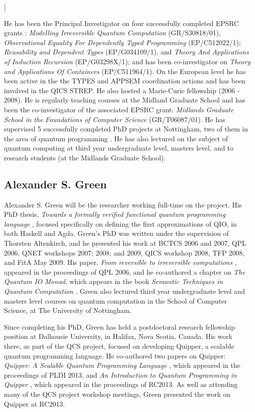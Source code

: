 \documentclass[a4paper]{article}
\begin{document}
\twocolumn[

He has been the Principal Investigator on four successfully completed
EPSRC grants : \emph{Modelling Irreversible Quantum Computation}
(GR/S30818/01), \emph{Observational Equality For Dependently Typed
  Programming} (EP/C512022/1); \emph{Reusability and Dependent Types} (EP/G034109/1), 
and 
\emph{Theory And Applications of Induction
  Recursion} (EP/G03298X/1); and has been co-investigator on
\emph{Theory and Applications Of Containers} (EP/C511964/1). 
On the European level he has been active in the the
TYPES and APPSEM coordination actions and has been involved in the
QICS STREP. He also hosted a Marie-Curie fellowship (2006 - 2008). He
is regularly teaching courses at the Midland Graduate School and has
been the co-investigator of the associated EPSRC grant: \emph{Midlands
  Graduate School in the Foundations of Computer Science}
(GR/T06087/01). He has supervised 5 successfully completed PhD
projects at Nottingham, two of them in the area of quantum
programming . He has also lectured 
on the subject of quantum computing at third year
undergraduate level, masters level, and to research students 
(at the Midlands Graduate School).

\subsection*{Alexander S. Green}
Alexander S. Green will be the researcher working full-time on the
project. His PhD thesis, \emph{Towards a formally verified functional
  quantum programming language} , focused
specifically on defining the first approximations of QIO, in both
Haskell and Agda. Green's PhD was written under the supervision of
Thorsten Altenkirch, and he presented his work at BCTCS 2006
and 2007, QPL 2006, QNET workshops 2007; 2008; and 2009, QICS workshop
2008, TFP 2008, and FitA May 2009. His paper, \emph{From reversible to
irreversible computations} , appeared in the
proceedings of QPL 2006, and he co-authored a chapter on \emph{The
Quantum IO Monad}, which appears in the book \emph{Semantic Techniques
in Quantum Computation} . Green also lectured third
year undergraduate level and masters level courses on quantum
computation in the School of Computer Science, at The University of
Nottingham. 

Since completing his PhD, Green has held a postdoctoral research
fellowship position at Dalhousie University, in Halifax, Nova Scotia,
Canada. His work there, as part of the QCS project, focused on
developing Quipper, a scalable quantum programming language. He
co-authored two papers on Quipper: \emph{Quipper: A Scalable Quantum
  Programming Language} , which appeared
in the proceedings of PLDI 2013, and \emph{An Introduction to Quantum
  Programming in Quipper} , which appeared in
the proceedings of RC2013. As well as attending many of the QCS
project workshop meetings, Green presented the work on Quipper at
RC2013.
\end{document}
